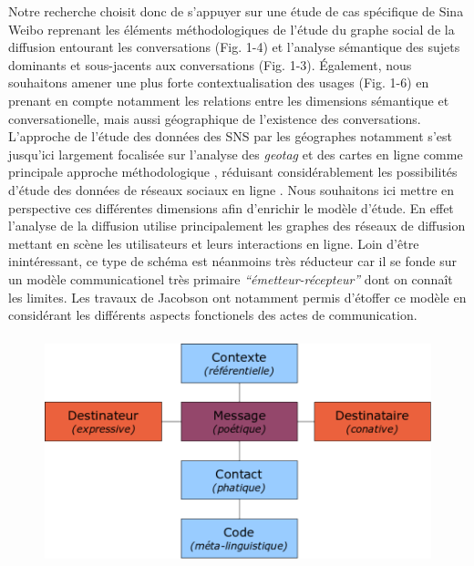 Notre recherche choisit donc de s{\textquoteright}appuyer sur une
\'etude de cas sp\'ecifique de Sina Weibo reprenant les \'el\'ements
m\'ethodologiques de l{\textquoteright}\'etude du graphe social de la
diffusion entourant les conversations (Fig. 1-4) et
l{\textquoteright}analyse s\'emantique des sujets dominants et
sous-jacents aux conversations (Fig. 1-3). \'Egalement, nous souhaitons
amener une plus forte contextualisation des usages (Fig. 1-6) en
prenant en compte notamment les relations entre les dimensions
s\'emantique et conversationelle, mais aussi g\'eographique de
l{\textquoteright}existence des conversations.
L{\textquoteright}approche de l{\textquoteright}\'etude des donn\'ees
des SNS par les g\'eographes notamment s{\textquoteright}est
jusqu{\textquoteright}ici largement focalis\'ee sur
l{\textquoteright}analyse des \textit{geotag} et des cartes en ligne
comme principale approche m\'ethodologique \cite{Graham2011,
Poorthuis2013}, r\'eduisant consid\'erablement les
possibilit\'es d{\textquoteright}\'etude des donn\'ees de r\'eseaux
sociaux en ligne \cite{Crampton2013}. Nous souhaitons ici mettre en
perspective ces diff\'erentes dimensions afin
d{\textquoteright}enrichir le mod\`ele d{\textquoteright}\'etude. En
effet l{\textquoteright}analyse de la diffusion utilise principalement
les graphes des r\'eseaux de diffusion mettant en sc\`ene les
utilisateurs et leurs interactions en ligne. Loin
d{\textquoteright}\^etre inint\'eressant, ce type de sch\'ema est
n\'eanmoins tr\`es r\'educteur car il se fonde sur un mod\`ele
communicationel tr\`es primaire
\textit{{\textquotedblleft}\'emetteur-r\'ecepteur{\textquotedblright}
}dont on conna\^it les limites. Les travaux de Jacobson ont notamment
permis d{\textquoteright}\'etoffer ce mod\`ele en consid\'erant les
diff\'erents aspects fonctionels des actes de communication.



\begin{figure}
    \centering

    \includegraphics[width=4.6894in,height=2.6114in]{figures/chap3/chapitre3-img5.png}


\end{figure}

